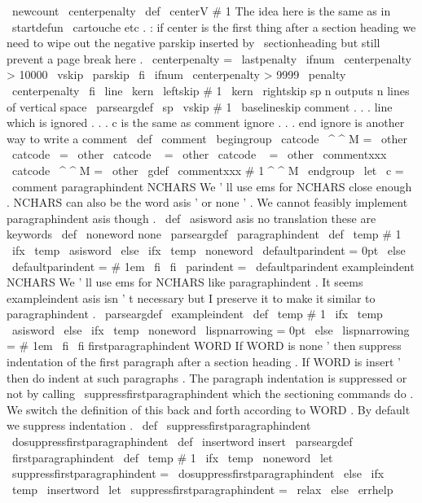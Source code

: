 {\
newcount
\
centerpenalty
\
def
\
centerV
#
1
{
%
%
The
idea
here
is
the
same
as
in
\
startdefun
\
cartouche
etc
.
:
if
%
center
is
the
first
thing
after
a
section
heading
we
need
to
wipe
%
out
the
negative
parskip
inserted
by
\
sectionheading
but
still
%
prevent
a
page
break
here
.
\
centerpenalty
=
\
lastpenalty
\
ifnum
\
centerpenalty
>
10000
\
vskip
\
parskip
\
fi
\
ifnum
\
centerpenalty
>
9999
\
penalty
\
centerpenalty
\
fi
\
line
{
\
kern
\
leftskip
#
1
\
kern
\
rightskip
}
%
}
%
sp
n
outputs
n
lines
of
vertical
space
%
\
parseargdef
\
sp
{
\
vskip
#
1
\
baselineskip
}
%
comment
.
.
.
line
which
is
ignored
.
.
.
%
c
is
the
same
as
comment
%
ignore
.
.
.
end
ignore
is
another
way
to
write
a
comment
%
\
def
\
comment
{
\
begingroup
\
catcode
\
^
^
M
=
\
other
%
\
catcode
\
=
\
other
\
catcode
\
{
=
\
other
\
catcode
\
}
=
\
other
%
\
commentxxx
}
{
\
catcode
\
^
^
M
=
\
other
\
gdef
\
commentxxx
#
1
^
^
M
{
\
endgroup
}
}
%
\
let
\
c
=
\
comment
%
paragraphindent
NCHARS
%
We
'
ll
use
ems
for
NCHARS
close
enough
.
%
NCHARS
can
also
be
the
word
asis
'
or
none
'
.
%
We
cannot
feasibly
implement
paragraphindent
asis
though
.
%
\
def
\
asisword
{
asis
}
%
no
translation
these
are
keywords
\
def
\
noneword
{
none
}
%
\
parseargdef
\
paragraphindent
{
%
\
def
\
temp
{
#
1
}
%
\
ifx
\
temp
\
asisword
\
else
\
ifx
\
temp
\
noneword
\
defaultparindent
=
0pt
\
else
\
defaultparindent
=
#
1em
\
fi
\
fi
\
parindent
=
\
defaultparindent
}
%
exampleindent
NCHARS
%
We
'
ll
use
ems
for
NCHARS
like
paragraphindent
.
%
It
seems
exampleindent
asis
isn
'
t
necessary
but
%
I
preserve
it
to
make
it
similar
to
paragraphindent
.
\
parseargdef
\
exampleindent
{
%
\
def
\
temp
{
#
1
}
%
\
ifx
\
temp
\
asisword
\
else
\
ifx
\
temp
\
noneword
\
lispnarrowing
=
0pt
\
else
\
lispnarrowing
=
#
1em
\
fi
\
fi
}
%
firstparagraphindent
WORD
%
If
WORD
is
none
'
then
suppress
indentation
of
the
first
paragraph
%
after
a
section
heading
.
If
WORD
is
insert
'
then
do
indent
at
such
%
paragraphs
.
%
%
The
paragraph
indentation
is
suppressed
or
not
by
calling
%
\
suppressfirstparagraphindent
which
the
sectioning
commands
do
.
%
We
switch
the
definition
of
this
back
and
forth
according
to
WORD
.
%
By
default
we
suppress
indentation
.
%
\
def
\
suppressfirstparagraphindent
{
\
dosuppressfirstparagraphindent
}
\
def
\
insertword
{
insert
}
%
\
parseargdef
\
firstparagraphindent
{
%
\
def
\
temp
{
#
1
}
%
\
ifx
\
temp
\
noneword
\
let
\
suppressfirstparagraphindent
=
\
dosuppressfirstparagraphindent
\
else
\
ifx
\
temp
\
insertword
\
let
\
suppressfirstparagraphindent
=
\
relax
\
else
\
errhelp
}}
